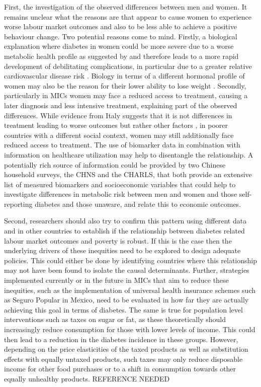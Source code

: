 First, the investigation of the observed differences between men and women. It remains unclear what the reasons are that appear to cause women to experience worse labour market outcomes and also to be less able to achieve a positive behaviour change. Two potential reasons come to mind. Firstly, a biological explanation where diabetes in women could be more severe due to a worse metabolic health profile as suggested by \textcite{Peters2014,Peters2015} and therefore leads to a more rapid development of debilitating complications, in particular due to a greater relative cardiovascular disease risk \parencite{Arnetz2014,Roche2013,Policardo2014,Catalan2015,Engelmann2016,Seghieri2015}. Biology in terms of a different hormonal profile of women may also be the reason for their lower ability to lose weight \parencite{Penno2013}.  Secondly, particularly in \acp{MIC} women may face a reduced access to treatment, causing a later diagnosis and less intensive treatment, explaining part of the observed differences. While evidence from Italy suggests that it is not differences in treatment leading to worse outcomes but rather other factors \parencite{Penno2013}, in poorer countries with a different social context, women may still additionally face reduced access to treatment. The use of biomarker data in combination with information on healthcare utilization may help to disentangle the relationship. A potentially rich source of information could be provided by two Chinese household surveys, the \acf{CHNS} and the \acf{CHARLS}, that both provide an extensive list of measured biomarkers and socioeconomic variables that could help to investigate differences in metabolic risk between men and women and those self-reporting diabetes and those unaware, and relate this to economic outcomes.

Second, researchers should also try to confirm this pattern using different data and in other countries to establish if the relationship between diabetes related labour market outcomes and poverty is robust. If this is the case then the underlying drivers of these inequities need to be explored to design adequate policies. This could either be done by identifying countries where this relationship may not have been found to isolate the causal determinants. Further, strategies implemented currently or in the future in \acp{MIC} that aim to reduce these inequities, such as the implementation of universal health insurance schemes such as Seguro Popular in Mexico, need to be evaluated in how far they are actually achieving this goal in terms of diabetes. The same is true for population level interventions such as taxes on sugar or fat, as these theoretically should increasingly reduce consumption for those with lower levels of income. This could then lead to a reduction in the diabetes incidence in these groups. However, depending on the price elasticities of the taxed products as well as substitution effects with equally untaxed products, such taxes may only reduce disposable income for other food purchases or to a shift in consumption towards other equally unhealthy products. REFERENCE NEEDED



